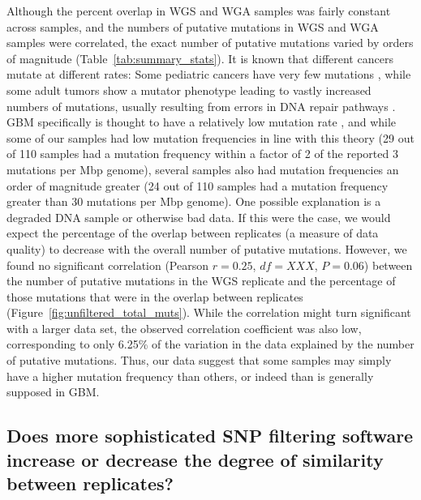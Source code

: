 \documentclass[11pt]{article} %
\begin{document}
Although the percent overlap in WGS and WGA samples was fairly constant across samples, and the numbers of putative mutations in WGS and WGA samples were correlated, the exact number of putative mutations varied by orders of magnitude (Table~\ref{tab:summary_stats}). It is known that different cancers mutate at different rates: Some pediatric cancers have very few mutations \citep{RB2hit, pediatric}, while some adult tumors show a mutator phenotype leading to vastly increased numbers of mutations, usually resulting from errors in DNA repair pathways \citep{mutator}. GBM specifically is thought to have a relatively low mutation rate \citep{Parsons, TCGA-GBM-13}, and while some of our samples had low mutation frequencies in line with this theory (29 out of 110 samples had a mutation frequency within a factor of 2 of the reported 3 mutations per Mbp genome), several samples also had mutation frequencies an order of magnitude greater (24 out of 110 samples had a mutation frequency greater than 30 mutations per Mbp genome). One possible explanation is a degraded DNA sample or otherwise bad data. If this were the case, we would expect the percentage of the overlap between replicates (a measure of data quality) to decrease with the overall number of putative mutations. However, we found no significant correlation (Pearson $r=0.25$, {\color{red}$df=XXX$}, $P=0.06$) between the number of putative mutations in the WGS replicate and the percentage of those mutations that were in the overlap between replicates (Figure~\ref{fig:unfiltered_total_muts}). While the correlation might turn significant with a larger data set, the observed correlation coefficient was also low, corresponding to only 6.25\% of the variation in the data explained by the number of putative mutations. Thus, our data suggest that some samples may simply have a higher mutation frequency than others, or indeed than is generally supposed in GBM.

\subsection*{Does more sophisticated SNP filtering software increase or decrease the degree of similarity between replicates?}
\end{document}
